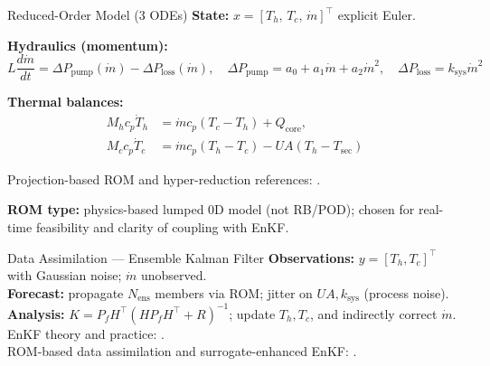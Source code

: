 \documentclass[aspectratio=169]{beamer}
\begin{document}
\begin{frame}{Reduced-Order Model (3 ODEs)}
\small
\textbf{State:} $x=[T_h,\,T_c,\,\dot m]^\top$ \hfill explicit Euler.

\medskip
\textbf{Hydraulics (momentum):}
\[
L \frac{d\dot m}{dt}=\Delta P_{\text{pump}}(\dot m)-\Delta P_{\text{loss}}(\dot m),\quad
\Delta P_{\text{pump}}=a_0+a_1\dot m + a_2 \dot m^2,\quad
\Delta P_{\text{loss}}=k_{\text{sys}}\dot m^2
\]

\textbf{Thermal balances:}
\[
\begin{aligned}
M_h c_p \dot T_h &= \dot m c_p (T_c-T_h)+Q_{\text{core}},\\
M_c c_p \dot T_c &= \dot m c_p (T_h-T_c)-UA(T_h-T_{\text{sec}})
\end{aligned}
\]

\medskip
\footnotesize
Projection-based ROM and hyper-reduction references: \cite{Benner2015,Quarteroni2016,Barrault2004,Chaturantabut2010}.

\smallskip
\textbf{ROM type:} physics-based lumped 0D model (not RB/POD); chosen for real-time feasibility and clarity of coupling with EnKF.

\end{frame}

\begin{frame}{Data Assimilation — Ensemble Kalman Filter}
\small
\textbf{Observations:} $y=[T_h,T_c]^\top$ with Gaussian noise; $\dot m$ unobserved.\\
\textbf{Forecast:} propagate $N_{\text{ens}}$ members via ROM; jitter on $UA,k_{\text{sys}}$ (process noise).\\
\textbf{Analysis:} $K=P_fH^\top(HP_fH^\top+R)^{-1}$; update $T_h,T_c$, and indirectly correct $\dot m$.\\

\medskip
\footnotesize
EnKF theory and practice: \cite{Evensen2009_EnKF}.\\
ROM-based data assimilation and surrogate-enhanced EnKF: \cite{Kovachki2022_MultifidelityEnKF,Maday2015}.
\end{frame}
\end{document}
